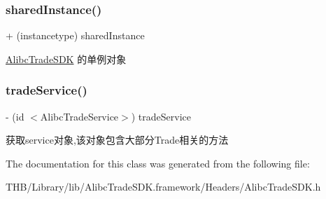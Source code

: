 \mbox{\label{interface_alibc_trade_s_d_k_a5415efdf2705a2859d0835358d1d0d20}} 
\subsubsection{\texorpdfstring{shared\+Instance()}{sharedInstance()}}
{\footnotesize\ttfamily + (instancetype) shared\+Instance \begin{DoxyParamCaption}{ }\end{DoxyParamCaption}}

\mbox{\hyperlink{interface_alibc_trade_s_d_k}{Alibc\+Trade\+S\+DK}} 的单例对象 \mbox{\label{interface_alibc_trade_s_d_k_aaccd78be3aa24071dfe2ac7d712beb60}} 
\subsubsection{\texorpdfstring{trade\+Service()}{tradeService()}}
{\footnotesize\ttfamily -\/ (id $<$Alibc\+Trade\+Service$>$) trade\+Service \begin{DoxyParamCaption}{ }\end{DoxyParamCaption}}

获取service对象,该对象包含大部分\+Trade相关的方法 

The documentation for this class was generated from the following file\+:\begin{DoxyCompactItemize}
\item 
T\+H\+B/\+Library/lib/\+Alibc\+Trade\+S\+D\+K.\+framework/\+Headers/Alibc\+Trade\+S\+D\+K.\+h\end{DoxyCompactItemize}
